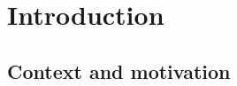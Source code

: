 %
%

\chapter{Introduction}
\label{ch:introduction}

\section{Context and motivation}
\label{sec:intro:context}

